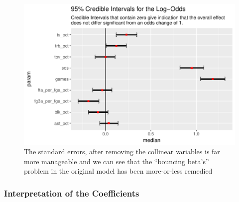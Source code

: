 \documentclass[10pt,a4paper, hidelinks]{article} %
\begin{document}
\begin{figure}[H]
	\centering
	\includegraphics[width=1\linewidth]{../fig/polr_coef}
	\caption{The standard errors, after removing the collinear variables is far more manageable and we can see that the ``bouncing beta's'' problem in the original model has been more-or-less remedied}
	\label{fig:polr_coef}
\end{figure}


\subsubsection{Interpretation of the Coefficients}
\end{document}
